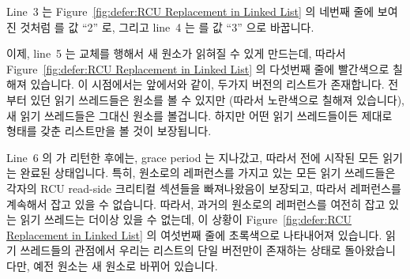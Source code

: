Line~3 는
Figure~\ref{fig:defer:RCU Replacement in Linked List} 의 네번째 줄에 보여진
것처럼  를 값 ``2'' 로, 그리고 line~4 는  를 값 ``3'' 으로
바꿉니다.

이제, line~5 는 교체를 행해서 새 원소가 읽혀질 수 있게
만드는데, 따라서
Figure~\ref{fig:defer:RCU Replacement in Linked List} 의 다섯번째 줄에
빨간색으로 칠해져 있습니다.
이 시점에서는 앞에서와 같이, 두가지 버전의 리스트가 존재합니다.
전부터 있던 읽기 쓰레드들은  원소를 볼 수 있지만 (따라서
노란색으로 칠해져 있습니다), 새 읽기 쓰레드들은 그대신  원소를
볼겁니다.
하지만 어떤 읽기 쓰레드들이든 제대로 형태를 갖춘 리스트만을 볼 것이 보장됩니다.

Line~6 의  가 리턴한 후에는, grace period 는 지나갔고,
따라서  전에 시작된 모든 읽기는 완료된 상태입니다.
특히,  원소로의 레퍼런스를 가지고 있는 모든 읽기 쓰레드들은 각자의
RCU read-side 크리티컬 섹션들을 빠져나왔음이 보장되고, 따라서 레퍼런스를
계속해서 잡고 있을 수 없습니다.
따라서, 과거의 원소로의 레퍼런스를 여전히 잡고 있는 읽기 쓰레드는 더이상 있을
수 없는데, 이 상황이
Figure~\ref{fig:defer:RCU Replacement in Linked List} 의 여섯번째 줄에
초록색으로 나타내어져 있습니다.
읽기 쓰레드들의 관점에서 우리는 리스트의 단일 버전만이 존재하는 상태로
돌아왔습니다만, 예전 원소는 새 원소로 바뀌어 있습니다.

